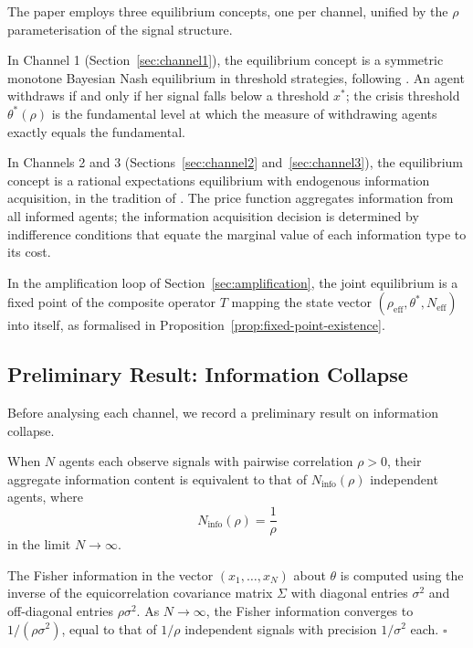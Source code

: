 The paper employs three equilibrium concepts, one per channel, unified by the $\rho$ parameterisation of the signal structure.

In Channel 1 (Section~\ref{sec:channel1}), the equilibrium concept is a symmetric monotone Bayesian Nash equilibrium in threshold strategies, following \citet{goldstein2005}. An agent withdraws if and only if her signal falls below a threshold $x^*$; the crisis threshold $\theta^*(\rho)$ is the fundamental level at which the measure of withdrawing agents exactly equals the fundamental.

In Channels 2 and 3 (Sections~\ref{sec:channel2} and~\ref{sec:channel3}), the equilibrium concept is a rational expectations equilibrium with endogenous information acquisition, in the tradition of \citet{grossman1980}. The price function aggregates information from all informed agents; the information acquisition decision is determined by indifference conditions that equate the marginal value of each information type to its cost.

In the amplification loop of Section~\ref{sec:amplification}, the joint equilibrium is a fixed point of the composite operator $T$ mapping the state vector $(\rho_{\text{eff}}, \theta^*, N_{\text{eff}})$ into itself, as formalised in Proposition~\ref{prop:fixed-point-existence}.

\subsection{Preliminary Result: Information Collapse}
\label{sec:model-collapse}

Before analysing each channel, we record a preliminary result on information collapse.

\begin{lemma}\label{lem:info-collapse}
When $N$ agents each observe signals with pairwise correlation $\rho > 0$, their aggregate information content is equivalent to that of $N_{\text{info}}(\rho)$ independent agents, where
\begin{equation}\label{eq:ninfo}
  N_{\text{info}}(\rho) = \frac{1}{\rho}
\end{equation}
in the limit $N \to \infty$.

 The Fisher information in the vector $(x_1, \ldots, x_N)$ about $\theta$ is computed using the inverse of the equicorrelation covariance matrix $\Sigma$ with diagonal entries $\sigma^2$ and off-diagonal entries $\rho\sigma^2$. As $N \to \infty$, the Fisher information converges to $1/(\rho\sigma^2)$, equal to that of $1/\rho$ independent signals with precision $1/\sigma^2$ each. $\square$
\end{lemma}

